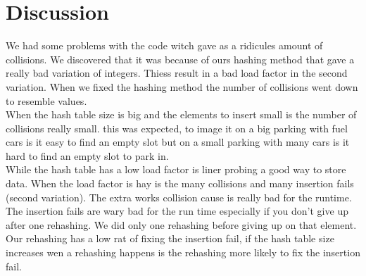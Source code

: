 \documentclass[paper=a4, fontsize=11pt]{scrartcl}
\numberwithin{equation}{section}		%
\numberwithin{figure}{section}			%
\numberwithin{table}{section}				%
\begin{document}
\section{Discussion}
We had some problems with the code witch gave as a ridicules amount of collisions. We discovered that it was because of ours hashing method that gave a really bad variation of integers. Thiess result in a bad load factor in the second variation. When we fixed the hashing method the number of collisions went down to resemble values.\\

When the hash table size is big and the elements to insert small is the number of collisions really small. this was expected, to image it on a big parking with fuel cars is it easy to find an empty slot but on a small parking with many cars is it hard to find an empty slot to park in.\\

While the hash table has a low load factor is liner probing a good way to store data. When the load factor is hay is the many collisions and many insertion fails (second variation). The extra works collision cause is really bad for the runtime. The insertion fails are wary bad for the run time especially if you don’t give up after one rehashing. We did only one rehashing before giving up on that element. Our rehashing has a low rat of fixing the insertion fail, if the hash table size increases wen a rehashing happens is the rehashing more likely to fix the insertion fail.



\end{document}

